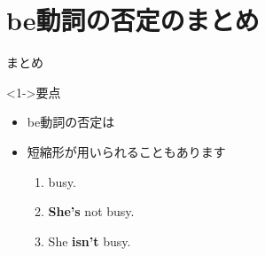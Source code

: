 \documentclass[aspectratio=169,xcolor={dvipsnames,table}]{beamer}
\begin{document}
\section{be動詞の否定のまとめ}
\begin{frame}[plain]{まとめ}

\begin{block}<1->{要点}
\begin{itemize}[square]
 \item<1->  be動詞の否定は\,\,
 \item<2-> 短縮形が用いられることもあります
       \begin{enumerate}[circle]
	\item<3->  busy.
	\item<5-> \textbf{She's} not busy.
	\item<7-> She \textbf{isn't} busy.
       \end{enumerate}
\end{itemize}
\end{block}
\end{frame}
\end{document}
